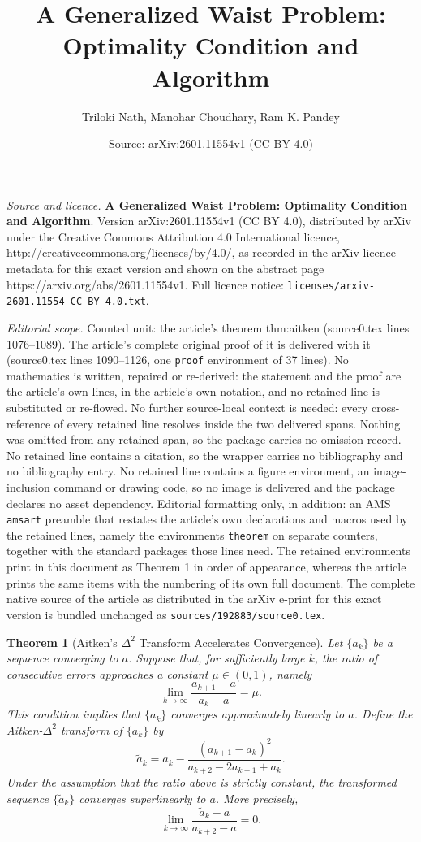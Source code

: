 \documentclass[10pt,a4paper]{amsart}
\title{\textbf{A Generalized Waist Problem: Optimality Condition and Algorithm}}
\author{Triloki Nath, Manohar Choudhary, Ram K. Pandey}
\date{Source: arXiv:2601.11554v1 (CC BY 4.0)}
\newtheorem{theorem}{Theorem}
\begin{document}
\maketitle

\noindent\emph{Source and licence.} \textbf{A Generalized Waist Problem: Optimality Condition and Algorithm}. Version arXiv:2601.11554v1 (CC BY 4.0), distributed by arXiv under the Creative Commons Attribution 4.0 International licence, http://creativecommons.org/licenses/by/4.0/, as recorded in the arXiv licence metadata for this exact version and shown on the abstract page https://arxiv.org/abs/2601.11554v1. Full licence notice: \texttt{licenses/arxiv-2601.11554-CC-BY-4.0.txt}.\par\smallskip

\noindent\textit{Editorial scope.} Counted unit: the article's theorem thm:aitken (source0.tex lines 1076--1089). The article's complete original proof of it is delivered with it (source0.tex lines 1090--1126, one \texttt{proof} environment of 37 lines). No mathematics is written, repaired or re-derived: the statement and the proof are the article's own lines, in the article's own notation, and no retained line is substituted or re-flowed.  No further source-local context is needed: every cross-reference of every retained line resolves inside the two delivered spans.  Nothing was omitted from any retained span, so the package carries no omission record.  No retained line contains a citation, so the wrapper carries no bibliography and no bibliography entry.  No retained line contains a figure environment, an image-inclusion command or drawing code, so no image is delivered and the package declares no asset dependency.  Editorial formatting only, in addition: an AMS \texttt{amsart} preamble that restates the article's own declarations and macros used by the retained lines, namely the environments \texttt{theorem} on separate counters, together with the standard packages those lines need.  The retained environments print in this document as Theorem 1 in order of appearance, whereas the article prints the same items with the numbering of its own full document.  The complete native source of the article as distributed in the arXiv e-print for this exact version is bundled unchanged as \texttt{sources/192883/source0.tex}.
\begin{theorem}[Aitken’s \(\Delta^2\) Transform Accelerates Convergence]\label{thm:aitken}
	Let \(\{a_k\}\) be a sequence converging to \(a\). Suppose that, for sufficiently large \(k\), the ratio of consecutive errors approaches a constant \(\mu \in (0,1)\), namely
	\[
	\lim_{k \to \infty} \frac{a_{k+1} - a}{a_k - a} = \mu.
	\]
	This condition implies that \(\{a_k\}\) converges approximately linearly to \(a\). Define the \emph{Aitken-\(\Delta^2\) transform} of \(\{a_k\}\) by
	\[
	\tilde{a}_k = a_k - \frac{(a_{k+1} - a_k)^2}{a_{k+2} - 2a_{k+1} + a_k}.
	\]
	Under the assumption that the ratio above is strictly constant, the transformed sequence \(\{\tilde{a}_k\}\) converges \emph{superlinearly} to \(a\). More precisely,
	\[
	\lim_{k \to \infty} \frac{\tilde{a}_{k} - a}{a_{k+2} - a} = 0.
	\]
\end{theorem}%
\end{document}
